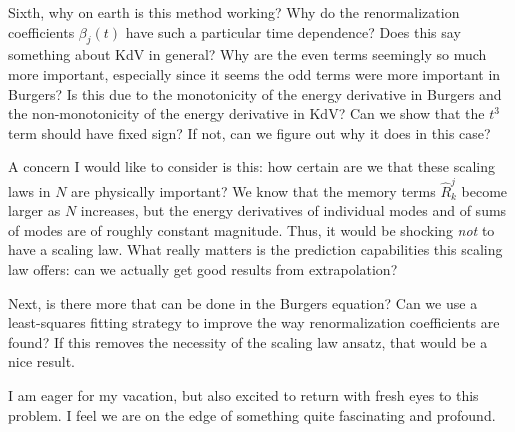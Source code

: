 \documentclass{article}
\begin{document}
Sixth, why on earth is this method working? Why do the renormalization coefficients $\beta_j(t)$ have such a particular time dependence? Does this say something about KdV in general? Why are the even terms seemingly so much more important, especially since it seems the odd terms were more important in Burgers? Is this due to the monotonicity of the energy derivative in Burgers and the non-monotonicity of the energy derivative in KdV? Can we show that the $t^3$ term should have fixed sign? If not, can we figure out why it does in this case?

A concern I would like to consider is this: how certain are we that these scaling laws in $N$ are physically important? We know that the memory terms $\hat{R}_k^j$ become larger as $N$ increases, but the energy derivatives of individual modes and of sums of modes are of roughly constant magnitude. Thus, it would be shocking \emph{not} to have a scaling law. What really matters is the prediction capabilities this scaling law offers: can we actually get good results from extrapolation?


Next, is there more that can be done in the Burgers equation? Can we use a least-squares fitting strategy to improve the way renormalization coefficients are found? If this removes the necessity of the scaling law ansatz, that would be a nice result.

I am eager for my vacation, but also excited to return with fresh eyes to this problem. I feel we are on the edge of something quite fascinating and profound.

\newpage



\end{document}
